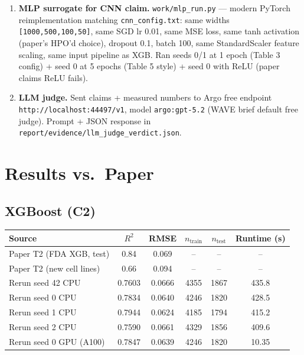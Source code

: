 \documentclass[11pt]{article}
\begin{document}
\begin{enumerate}
\item \textbf{MLP surrogate for CNN claim.} \texttt{work/mlp\_run.py} --- modern PyTorch reimplementation matching \texttt{cnn\_config.txt}: same widths \texttt{[1000,500,100,50]}, same SGD lr 0.01, same MSE loss, same tanh activation (paper's HPO'd choice), dropout 0.1, batch 100, same StandardScaler feature scaling, same input pipeline as XGB. Ran seeds 0/1 at 1 epoch (Table 3 config) + seed 0 at 5 epochs (Table 5 style) + seed 0 with ReLU (paper claims ReLU fails).
\item \textbf{LLM judge.} Sent claims + measured numbers to Argo free endpoint \texttt{http://localhost:44497/v1}, model \texttt{argo:gpt-5.2} (WAVE brief default free judge). Prompt + JSON response in \texttt{report/evidence/llm\_judge\_verdict.json}.
\end{enumerate}

\section{Results vs.\ Paper}

\subsection{XGBoost (C2)}

\begin{center}
\begin{tabular}{@{}l S[table-format=1.4] S[table-format=1.4] S[table-format=5.0] S[table-format=5.0] S[table-format=3.1]@{}}
\toprule
Source & {$R^2$} & {RMSE} & {$n_{\text{train}}$} & {$n_{\text{test}}$} & {Runtime (s)} \\
\midrule
Paper T2 (FDA XGB, test) & 0.84 & 0.069 & {--} & {--} & {--} \\
Paper T2 (new cell lines) & 0.66 & 0.094 & {--} & {--} & {--} \\
Rerun seed 42 CPU & 0.7603 & 0.0666 & 4355 & 1867 & 435.8 \\
Rerun seed 0 CPU & 0.7834 & 0.0640 & 4246 & 1820 & 428.5 \\
Rerun seed 1 CPU & 0.7944 & 0.0624 & 4185 & 1794 & 415.2 \\
Rerun seed 2 CPU & 0.7590 & 0.0661 & 4329 & 1856 & 409.6 \\
Rerun seed 0 GPU (A100) & 0.7847 & 0.0639 & 4246 & 1820 & 10.35 \\
\bottomrule
\end{tabular}
\end{center}
\end{document}
